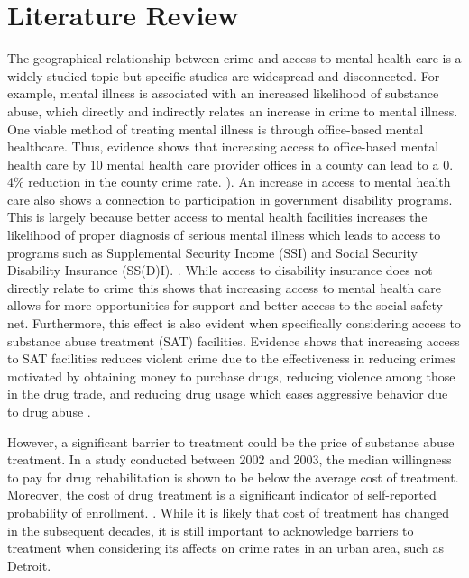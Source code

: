 \documentclass[12pt]{article}
\begin{document}
\section{Literature Review} \label{sec:literature}
    The geographical relationship between crime and access to mental health care is a widely studied topic but specific studies are widespread and disconnected. For example, mental illness is associated with an increased likelihood of substance abuse, which directly and indirectly relates an increase in crime to mental illness. One viable method of treating mental illness is through office-based mental healthcare. Thus, evidence shows that increasing access to office-based mental health care by 10 mental health care provider offices in a county can lead to a 0. 4\% reduction in the county crime rate. \cite{mental_healthcare_and_crime}). An increase in access to mental health care also shows a connection to participation in government disability programs. This is largely because better access to mental health facilities increases the likelihood of proper diagnosis of serious mental illness which leads to access to programs such as Supplemental Security Income (SSI) and Social Security Disability Insurance (SS(D)I). \cite{mental_health_and_disability}. While access to disability insurance does not directly relate to crime this shows that increasing access to mental health care allows for more opportunities for support and better access to the social safety net. Furthermore, this effect is also evident when specifically considering access to substance abuse treatment (SAT) facilities. Evidence shows that increasing access to SAT facilities reduces violent crime due to the effectiveness in reducing crimes motivated by obtaining money to purchase drugs, reducing violence among those in the drug trade, and reducing drug usage which eases aggressive behavior due to drug abuse \cite{SAT_centers_and_crime}. 

However, a significant barrier to treatment could be the price of substance abuse treatment. In a study conducted between 2002 and 2003, the median willingness to pay for drug rehabilitation is shown to be below the average cost of treatment. Moreover, the cost of drug treatment is a significant indicator of self-reported probability of enrollment. \cite{cost_of_drug_treatment}. While it is likely that cost of treatment has changed in the subsequent decades, it is still important to acknowledge barriers to treatment when considering its affects on crime rates in an urban area, such as Detroit. 
\end{document}
